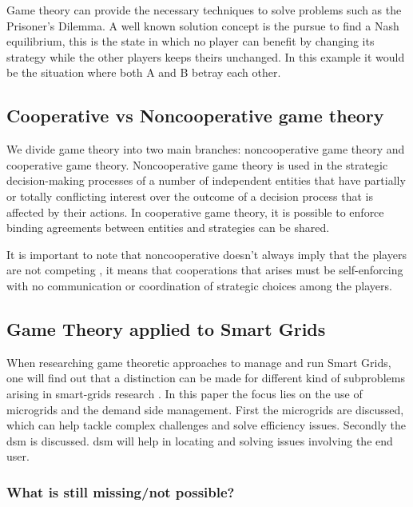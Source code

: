 Game theory can provide the necessary techniques to solve problems such as the Prisoner's Dilemma. A well known solution concept is the pursue to find a Nash equilibrium, this is the state in which no player can benefit by changing its strategy while the other players keeps theirs unchanged. In this example it would be the situation where both A and B betray each other.

\subsection{Cooperative vs Noncooperative game theory}
We divide game theory into two main branches: noncooperative game theory and cooperative game theory. Noncooperative game theory is used in the strategic decision-making processes of a number of independent entities that have partially or totally conflicting interest over the outcome of a decision process that is affected by their actions\cite{keypaper}. In cooperative game theory, it is possible to enforce binding agreements between entities and strategies can be shared. 

It is important to note that noncooperative doesn't always imply that the players are not competing , it means that cooperations that arises must be self-enforcing with no communication or coordination of strategic choices among the players.\cite{keypaper}


\subsection{Game Theory applied to Smart Grids}
When researching game theoretic approaches to manage and run Smart Grids, one will find out that a distinction can be made for different kind of subproblems arising in smart-grids research \cite{keypaper}. In this paper the focus lies on the use of microgrids and the demand side management. First the microgrids are discussed, which can help tackle complex challenges and solve efficiency issues. Secondly the \gls{dsm} is discussed. \gls{dsm} will help in locating and solving issues involving the end user. 


\subsubsection{What is still missing/not possible?}

